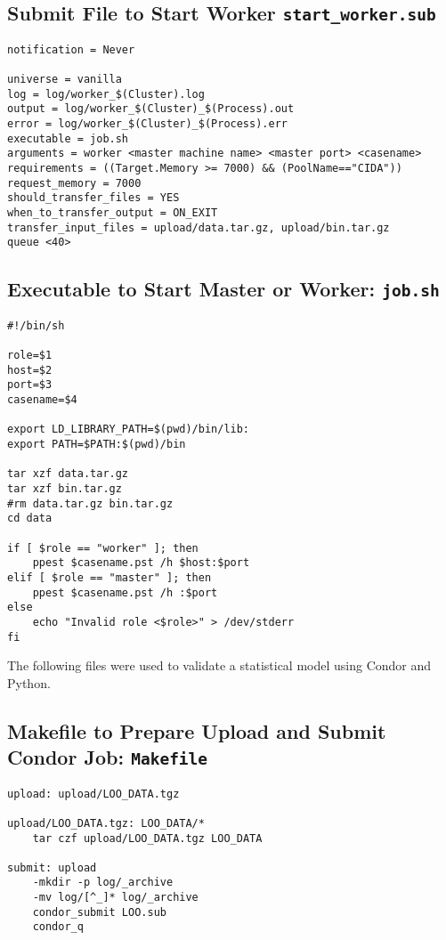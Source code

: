 \documentclass[11pt,twoside,onecolumn]{usgsreport}
\begin{document}
\subsection{Submit File to Start Worker \texttt{start\_worker.sub}}
\begin{lstlisting}
notification = Never

universe = vanilla
log = log/worker_$(Cluster).log
output = log/worker_$(Cluster)_$(Process).out
error = log/worker_$(Cluster)_$(Process).err
executable = job.sh
arguments = worker <master machine name> <master port> <casename>
requirements = ((Target.Memory >= 7000) && (PoolName=="CIDA"))
request_memory = 7000
should_transfer_files = YES
when_to_transfer_output = ON_EXIT
transfer_input_files = upload/data.tar.gz, upload/bin.tar.gz
queue <40>
\end{lstlisting}

\subsection{Executable to Start Master or Worker: \texttt{job.sh}}
\begin{lstlisting}
#!/bin/sh

role=$1
host=$2
port=$3
casename=$4

export LD_LIBRARY_PATH=$(pwd)/bin/lib:
export PATH=$PATH:$(pwd)/bin

tar xzf data.tar.gz
tar xzf bin.tar.gz
#rm data.tar.gz bin.tar.gz
cd data

if [ $role == "worker" ]; then
	ppest $casename.pst /h $host:$port
elif [ $role == "master" ]; then
	ppest $casename.pst /h :$port
else
	echo "Invalid role <$role>" > /dev/stderr
fi
\end{lstlisting}

The following files were used to validate a statistical model \citep{fishmodel} using Condor and Python. 
\subsection{Makefile to Prepare Upload and Submit Condor Job: \texttt{Makefile}}
\begin{lstlisting}
upload: upload/LOO_DATA.tgz 

upload/LOO_DATA.tgz: LOO_DATA/*
	tar czf upload/LOO_DATA.tgz LOO_DATA

submit: upload
	-mkdir -p log/_archive
	-mv log/[^_]* log/_archive
	condor_submit LOO.sub
	condor_q

\end{lstlisting}
\end{document}

